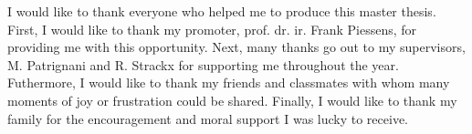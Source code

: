 \documentclass[10pt,a4paper,master=cws, masteroption=ai,english,inputenc=utf8]{kulemt}
\begin{document}
\newcommand{\MiniML}{\mbox{MiniML}} %
\newcommand{\cmath}[1]{\ensuremath{\mathit{#1}}} %
\newcommand{\lsttext}[1]{\lstinline[mathescape]!#1!} %
\newcommand{\longspace}{\;\;\;\;\;\;}
\newcommand{\inlinecode}{\texttt}
\newcommand{\expl}[1]{{\text{\footnotesize#1}}}
\newcommand{\LLVMIR}{\mbox{LLVM IR}}
\newcommand{\compiled}[1]{#1^{\downarrow}}
\newcommand{\ova}{\overline{\alpha}}
\newcommand{\gray}{\cellcolor{lightgray}}
\newcommand{\earlier}[2]{{\protect\myref{#1}{#2}} on {\protect\mypageref{#2}}}
\newcommand{\intertextt}[1]{
& & \\
\multicolumn{3}{@{}p{\textwidth}@{}}{\indent#1}\\
& & \\
}
\newcommand{\annot}[1]{[#1]}
\newcommand{\nl}{\\ & &}
\newcommand{\makes}{& \ensuremath{\rightarrow} &}
\newcommand{\compile}[1]{[[#1]]}
\newcommand{\mypageref}[1]{Page~\pageref{#1}}

\newcommand{\surroundrule}[2][0.3em]{
\leavevmode\raisedrule[#1]{1pt}#2\raisedrule[#1]{1pt}}
\newenvironment{attack}[1]{\par\par\noindent\hspace{-1ex}\surroundrule{#1}\vspace{-0.5em}\par\par}{~\vspace{0.5em}\par\par\noindent\leavevmode\raisedrule[1em]{1pt}\\}



\begin{preface}
I would like to thank everyone who helped me to produce this master thesis.
First, I would like to thank my promoter,
prof. dr. ir. Frank Piessens, for providing me with this opportunity.
Next, many thanks go out to my supervisors, M. Patrignani and R. Strackx for supporting me throughout the year.
Futhermore, I would like to thank my friends and classmates with whom many moments of joy or frustration could be shared.
Finally, I would like to thank my family for the encouragement and moral support I was lucky to receive.
\end{preface}
\end{document}

